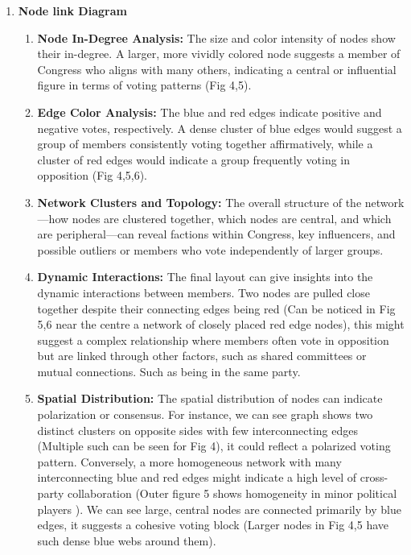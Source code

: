 \documentclass[conference]{IEEEtran}
\begin{document}
\begin{enumerate}
    

    
    
\item \textbf{Node link Diagram}
\begin{enumerate}
    \item
    \textbf{Node In-Degree Analysis:} The size and color intensity of nodes show their in-degree. A larger, more vividly colored node suggests a member of Congress who aligns with many others, indicating a central or influential figure in terms of voting patterns (Fig 4,5).

    \item
    \textbf{Edge Color Analysis:} The blue and red edges indicate positive and negative votes, respectively. A dense cluster of blue edges would suggest a group of members consistently voting together affirmatively, while a cluster of red edges would indicate a group frequently voting in opposition (Fig 4,5,6).
 
    \item
    \textbf{Network Clusters and Topology:} The overall structure of the network—how nodes are clustered together, which nodes are central, and which are peripheral—can reveal factions within Congress, key influencers, and possible outliers or members who vote independently of larger groups.

    \item 
    \textbf{Dynamic Interactions:} The final layout can give insights into the dynamic interactions between members. Two nodes are pulled close together despite their connecting edges being red (Can be noticed in Fig 5,6 near the centre a network of closely placed red edge nodes), this might suggest a complex relationship where members often vote in opposition but are linked through other factors, such as shared committees or mutual connections. Such as being in the same party.


    \item
    \textbf{Spatial Distribution:} The spatial distribution of nodes can indicate polarization or consensus. For instance, we can see graph shows two distinct clusters on opposite sides with few interconnecting edges (Multiple such can be seen for Fig 4), it could reflect a polarized voting pattern. Conversely, a more homogeneous network with many interconnecting blue and red edges might indicate a high level of cross-party collaboration (Outer figure 5 shows homogeneity in minor political players ). We can see large, central nodes are connected primarily by blue edges, it suggests a cohesive voting block (Larger nodes in Fig 4,5 have such dense blue webs around them).


\end{enumerate}
\end{enumerate}
\end{document}
